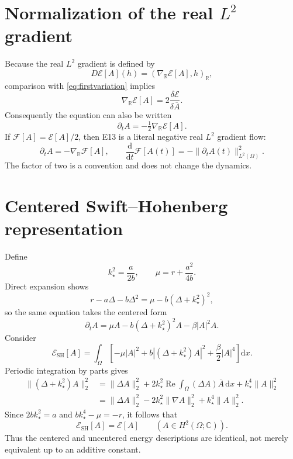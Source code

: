 \documentclass[11pt]{article}
\newcommand{\Om}{\Omega}
\newcommand{\E}{\mathcal E}
\newcommand{\F}{\mathcal F}
\newcommand{\dd}{\mathrm d}
\newcommand{\Real}{\operatorname{Re}}
\begin{document}
\section{Normalization of the real $L^2$ gradient}
Because the real $L^2$ gradient is defined by
\[
 D\E[A](h)=(\nabla_{\mathbb R}\E[A],h)_{\mathbb R},
\]
comparison with \eqref{eq:firstvariation} implies
\begin{equation}\label{eq:gradientfactor}
 \nabla_{\mathbb R}\E[A]
   =2\frac{\delta\E}{\delta\overline A}.
\end{equation}
Consequently the equation can also be written
\[
 \partial_t A=-\tfrac12\nabla_{\mathbb R}\E[A].
\]
If $\F[A]=\E[A]/2$, then E13 is a literal negative real $L^2$
gradient flow:
\begin{equation}\label{eq:realflow}
 \partial_t A=-\nabla_{\mathbb R}\F[A],\qquad
 \frac{\dd}{\dd t}\F[A(t)]
     =-\|\partial_t A(t)\|_{L^2(\Om)}^2.
\end{equation}
The factor of two is a convention and does not change the dynamics.

\section{Centered Swift--Hohenberg representation}
Define
\begin{equation}\label{eq:kmu}
 k_\star^2=\frac{a}{2b},\qquad
 \mu=r+\frac{a^2}{4b}.
\end{equation}
Direct expansion shows
\[
 r-a\Delta-b\Delta^2=\mu-b(\Delta+k_\star^2)^2,
\]
so the same equation takes the centered form
\begin{equation}\label{eq:centeredflow}
 \partial_t A=\mu A-b(\Delta+k_\star^2)^2A-\beta|A|^2A.
\end{equation}
Consider
\begin{equation}\label{eq:centeredenergy}
 \E_{\mathrm{SH}}[A]
 =\int_\Om\left[-\mu|A|^2
      +b|(\Delta+k_\star^2)A|^2
      +\frac\beta2|A|^4\right]\dd x.
\end{equation}
Periodic integration by parts gives
\begin{align*}
 \|(\Delta+k_\star^2)A\|_2^2
 &=\|\Delta A\|_2^2
   +2k_\star^2\Real\int_\Om(\Delta A)\overline A\,\dd x
   +k_\star^4\|A\|_2^2\\
 &=\|\Delta A\|_2^2-2k_\star^2\|\nabla A\|_2^2
   +k_\star^4\|A\|_2^2.
\end{align*}
Since $2bk_\star^2=a$ and $bk_\star^4-\mu=-r$, it follows that
\begin{equation}\label{eq:equalenergy}
 \E_{\mathrm{SH}}[A]=\E[A]
 \qquad(A\in H^2(\Om;\mathbb C)).
\end{equation}
Thus the centered and uncentered energy descriptions are identical,
not merely equivalent up to an additive constant.
\end{document}
